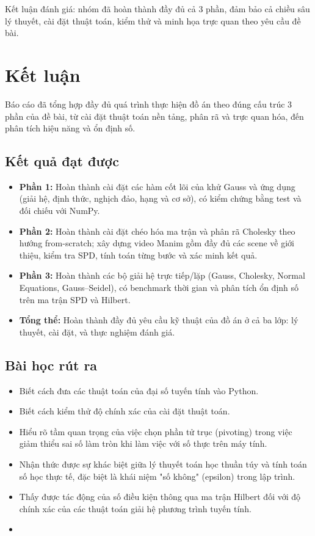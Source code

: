 \documentclass[a4paper]{article}
\begin{document}
Kết luận đánh giá: nhóm đã hoàn thành đầy đủ cả 3 phần, đảm bảo cả chiều sâu lý thuyết, cài đặt thuật toán, kiểm thử và minh họa trực quan theo yêu cầu đề bài.

\section{Kết luận}

Báo cáo đã tổng hợp đầy đủ quá trình thực hiện đồ án theo đúng cấu trúc 3 phần của đề bài, từ cài đặt thuật toán nền tảng, phân rã và trực quan hóa, đến phân tích hiệu năng và ổn định số.

\subsection{Kết quả đạt được}

\begin{itemize}
    \item \textbf{Phần 1:} Hoàn thành cài đặt các hàm cốt lõi của khử Gauss và ứng dụng (giải hệ, định thức, nghịch đảo, hạng và cơ sở), có kiểm chứng bằng test và đối chiếu với NumPy.
    \item \textbf{Phần 2:} Hoàn thành cài đặt chéo hóa ma trận và phân rã Cholesky theo hướng from-scratch; xây dựng video Manim gồm đầy đủ các scene về giới thiệu, kiểm tra SPD, tính toán từng bước và xác minh kết quả.
    \item \textbf{Phần 3:} Hoàn thành các bộ giải hệ trực tiếp/lặp (Gauss, Cholesky, Normal Equations, Gauss--Seidel), có benchmark thời gian và phân tích ổn định số trên ma trận SPD và Hilbert.
    \item \textbf{Tổng thể:} Hoàn thành đầy đủ yêu cầu kỹ thuật của đồ án ở cả ba lớp: lý thuyết, cài đặt, và thực nghiệm đánh giá.
\end{itemize}

\subsection{Bài học rút ra}

\begin{itemize}
    \item Biết cách đưa các thuật toán của đại số tuyến tính vào Python.
    \item Biết cách kiểm thử độ chính xác của cài đặt thuật toán.
    \item Hiểu rõ tầm quan trọng của việc chọn phần tử trục (pivoting) trong việc giảm thiểu sai số làm tròn khi làm việc với số thực trên máy tính.
    \item Nhận thức được sự khác biệt giữa lý thuyết toán học thuần túy và tính toán số học thực tế, đặc biệt là khái niệm "số không" (epsilon) trong lập trình.
    \item Thấy được tác động của số điều kiện thông qua ma trận Hilbert đối với độ chính xác của các thuật toán giải hệ phương trình tuyến tính.
    \item  
\end{itemize}
\end{document}
